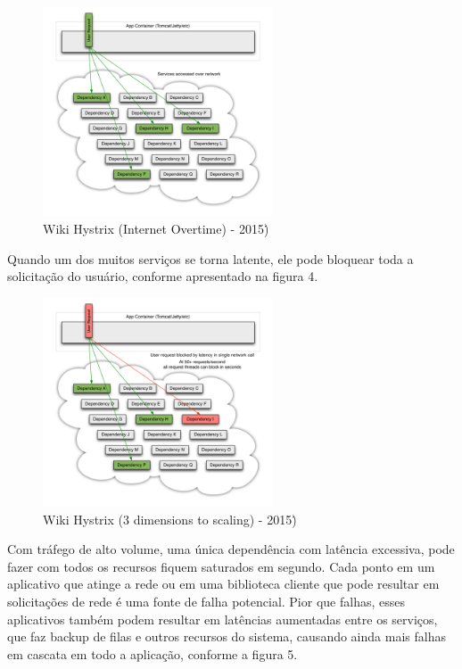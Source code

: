 \begin{figure}[h]
\centering
\includegraphics[height=6.2cm]{imagens/figura3}
\caption{Wiki Hystrix (Internet Overtime) - 2015)\.}
\label{fig:exemplo}
\end{figure}

Quando um dos muitos serviços se torna latente, ele pode bloquear toda a solicitação do usuário, conforme apresentado na figura 4.

\begin{figure}[h]
\centering
\includegraphics[height=6.2cm]{imagens/figura4}
\caption{Wiki Hystrix (3 dimensions to scaling) - 2015)\.}
\label{fig:exemplo}
\end{figure}

Com tráfego de alto volume, uma única dependência com latência excessiva, pode fazer com todos os recursos fiquem saturados em segundo. Cada ponto em um aplicativo que atinge a rede ou em uma biblioteca cliente que pode resultar em solicitações de rede é uma fonte de falha potencial. Pior que falhas, esses aplicativos também podem resultar em latências aumentadas entre os serviços, que faz backup de filas e outros recursos do sistema, causando ainda mais falhas em cascata em todo a aplicação, conforme a figura 5.

